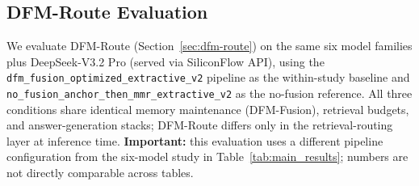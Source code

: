\subsection{DFM-Route Evaluation}
\label{sec:exp-route}

We evaluate DFM-Route (Section~\ref{sec:dfm-route}) on the same six model families plus DeepSeek-V3.2 Pro (served via SiliconFlow API), using the \texttt{dfm\_fusion\_optimized\_extractive\_v2} pipeline as the within-study baseline and \texttt{no\_fusion\_anchor\_then\_mmr\_extractive\_v2} as the no-fusion reference.
All three conditions share identical memory maintenance (DFM-Fusion), retrieval budgets, and answer-generation stacks; DFM-Route differs only in the retrieval-routing layer at inference time.
\textbf{Important:} this evaluation uses a different pipeline configuration from the six-model study in Table~\ref{tab:main_results}; numbers are not directly comparable across tables.

